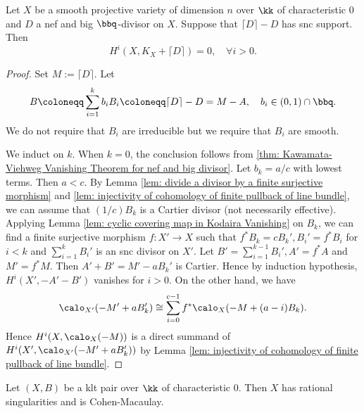     \begin{theorem}\label{thm: Kawamata-Viehweg Vanishing Theorem in KM98}
        Let \(X\) be a smooth projective variety of dimension \(n\) over \(\kk\) of characteristic \(0\) and \(D\) a nef and big \(\bbq\)-divisor on \(X\).
        Suppose that \(\lceil D \rceil - D\) has snc support.
        Then
        \[
            H^i(X, K_X + \lceil D \rceil) = 0,\quad \forall i > 0.
        \]
    \end{theorem}
    \begin{proof}
        Set \(M:= \lceil D \rceil\).
        Let 
        \[ B \coloneqq \sum_{i=1}^k b_i B_i \coloneqq \lceil D \rceil - D = M - A, \quad b_i \in (0,1) \cap \bbq. \]
        We do not require that \(B_i\) are irreducible but we require that \(B_i\) are smooth.

        We induct on \(k\).
        When \(k = 0\), the conclusion follows from \cref{thm: Kawamata-Viehweg Vanishing Theorem for nef and big divisor}.
        Let \(b_k = a/c\) with lowest terms.
        Then \(a<c\).
        By Lemma \ref{lem: divide a divisor by a finite surjective morphism} and \ref{lem: injectivity of cohomology of finite pullback of line bundle}, we can assume that \((1/c)B_k\) is a Cartier divisor (not necessarily effective).
        Applying Lemma \ref{lem: cyclic covering map in Kodaira Vanishing} on \(B_k\),
        we can find a finite surjective morphism \(f: X' \to X\) such that \(f^*B_k = cB_k', B_i' = f^*B_i\) for \(i < k\) and \(\sum_{i=1}^{k} B_i'\) is an snc divisor on \(X'\).
        Let \(B' = \sum_{i=1}^{k-1}B_i', A' = f^*A\) and \(M' = f^*M\).
        Then \(A'+ B' =  M'-aB_k'\) is Cartier.
        Hence by induction hypothesis, \( H^i(X', -A' - B')\) vanishes for \(i > 0\).
        On the other hand, we have
        \[ \calo_{X'}(-M' + aB_k') \cong \sum_{i=0}^{c-1} f^*\calo_X(-M + (a-i) B_k). \]
        Hence \(H^i(X,\calo_X(-M))\) is a direct summand of \(H^i(X', \calo_{X'}(-M' + aB_k'))\) by Lemma \ref{lem: injectivity of cohomology of finite pullback of line bundle}.
    \end{proof}

    \begin{lemma}\label{lem: klt pair has rational singularities and is Cohen-Macaulay}
        Let \((X,B)\) be a klt pair over \(\kk\) of characteristic \(0\).
        Then \(X\) has rational singularities and is Cohen-Macaulay.
    \end{lemma}

